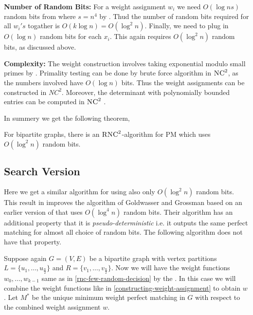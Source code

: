 \textbf{Number of Random Bits:}	For a weight assignment $w_i$ we need $O(\log ns)$ random bits from  where $s=n^4$ by . Thud the number of random bits required for all $w_i's$ togather is $O(k\log n)=O(\log^2 n)$. Finally, we need to plug in $O(\log n)$ random bits for each $x_i$. This again requires $O(\log ^2n)$ random bits, as discussed above.\vspace{3mm}

\textbf{Complexity:} The weight construction involves taking exponential modulo small primes by . Primality testing can be done by brute force algorithm in $\textsc{NC}^2$, as the numbers involved have $O(\log n)$ bits. Thus the weight assignments can be constructed in $NC^2$. Moreover, the determinant with polynomially bounded entries can be computed in $\textsc{NC}^2$ \cite{Berkowitz_1984_Oct}. \parinn

In summery we get the following theorem,

\begin{Theorem}{\cite[Theorem 4.1]{FennerGurjarThierauf_2016_Bpm_CONF}}{}
	For bipartite graphs, there is an $\textsc{RNC}^2$-algorithm for \textsc{PM} which uses $O(\log ^2 n)$ random bits.
\end{Theorem}
\subsection{Search Version}\parinn
Here we get a similar algorithm for  using also only $O(\log^2 n)$ random bits. This result in \cite{FennerGurjarThierauf_2016_Bpm_CONF} improves the  algorithm of Goldwasser and Grossman \cite{GoldwasserGrossman_2017_BPM} based on an earlier version of \cite{FennerGurjarThierauf_2016_Bpm_CONF} that uses $O(\log ^4n)$ random bits. Their  algorithm has an additional property that it is \textit{pseudo-deterministic} i.e. it outputs the same perfect matching for almost all choice of random bits. The following algorithm does not have that property.

Suppose again $G=(V,E)$ be a bipartite graph with vertex partitions $L=\{u_1,\dots, u_{\frac{n}{2}}\}$ and $R=\{v_1,\dots,v_{\frac{n }{2}}\}$. Now we will have the weight functions $w_0,\dots, w_{k-1}$ same as in \autoref{rnc-few-random-decision} by the . In this case we will combine the weight functions like in \autoref{constructing-weight-assignment} to obtain $w$. Let $M^*$ be the unique minimum weight perfect matching in $G$ with respect to the combined weight assignment $w$. 

